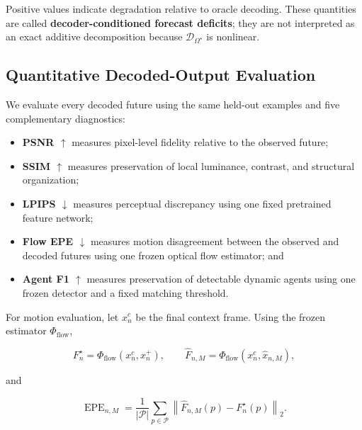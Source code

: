 Positive values indicate degradation relative to oracle decoding.
These quantities are called \textbf{decoder-conditioned forecast
deficits}; they are not interpreted as an exact additive decomposition
because \(\mathcal D_{\Omega^\star}\) is nonlinear.


\subsection{Quantitative Decoded-Output Evaluation}
\label{app:rgb_quantitative}

We evaluate every decoded future using the same held-out examples and
five complementary diagnostics:

\begin{itemize}
    \item \textbf{PSNR \(\uparrow\)} measures pixel-level fidelity
    relative to the observed future;

    \item \textbf{SSIM \(\uparrow\)} measures preservation of local
    luminance, contrast, and structural organization;

    \item \textbf{LPIPS \(\downarrow\)} measures perceptual discrepancy
    using one fixed pretrained feature network;

    \item \textbf{Flow EPE \(\downarrow\)} measures motion disagreement
    between the observed and decoded futures using one frozen optical
    flow estimator; and

    \item \textbf{Agent F1 \(\uparrow\)} measures preservation of
    detectable dynamic agents using one frozen detector and a fixed
    matching threshold.
\end{itemize}

For motion evaluation, let \(x_n^c\) be the final context frame. Using
the frozen estimator \(\Phi_{\mathrm{flow}}\),

\begin{equation*}
F_n^\star
=
\Phi_{\mathrm{flow}}(x_n^c,x_n^+),
\qquad
\widehat F_{n,M}
=
\Phi_{\mathrm{flow}}(x_n^c,\widehat x_{n,M}),
\end{equation*}

and

\begin{equation*}
\operatorname{EPE}_{n,M}
=
\frac{1}{|\mathcal P|}
\sum_{p\in\mathcal P}
\left\|
\widehat F_{n,M}(p)-F_n^\star(p)
\right\|_2.
\end{equation*}

